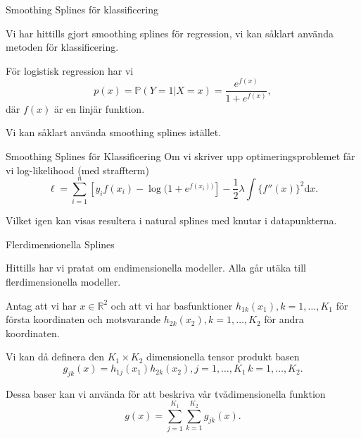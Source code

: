 \documentclass[10pt,english]{beamer}
\begin{document}
\begin{frame}{Smoothing Splines för klassificering}
    
    Vi har hittills gjort smoothing splines för regression, vi kan såklart använda metoden för klassificering.

    För logistisk regression har vi
    \begin{equation*}
        p(x) = \mathbb{P}(Y = 1 | X = x) = \frac{e^{f(x)}}{1 + e^{f(x)}},
    \end{equation*}
    där $f(x)$ är en linjär funktion.

    Vi kan såklart använda smoothing splines istället.

\end{frame}

\begin{frame}{Smoothing Splines för Klassificering}
    Om vi skriver upp optimeringsproblemet får vi log-likelihood (med straffterm)
    \begin{equation*}
        \ell = \sum_{i=1}^{n} \left[y_i f(x_i) - \log(1 + e^{f(x_i))} \right] - \frac{1}{2}\lambda \int \{ f''(x)\}^2 \mathrm{d}x.
    \end{equation*}

    Vilket igen kan visas resultera i natural splines med knutar i datapunkterna.
\end{frame}

\begin{frame}{Flerdimensionella Splines}
    
    Hittills har vi pratat om endimensionella modeller. Alla går utäka till flerdimensionella modeller.

    Antag att vi har $x \in \mathbb{R}^2$ och att vi har basfunktioner $h_{1k}(x_1), k = 1, \ldots, K_1$ för första koordinaten och motsvarande $h_{2k}(x_2), k = 1, \ldots, K_2$ för andra koordinaten.

    Vi kan då definera den $K_1 \times K_2$ dimensionella tensor produkt basen
    \begin{equation*}
        g_{jk}(x) = h_{1j}(x_1)h_{2k}(x_2), j = 1,\ldots,K_1 \, k = 1, \ldots, K_2.
    \end{equation*}

    Dessa baser kan vi använda för att beskriva vår tvådimensionella funktion
    \begin{equation*}
        g(x) = \sum_{j=1}^{K_1} \sum_{k=1}^{K_2} g_{jk}(x).
    \end{equation*}

\end{frame}
\end{document}
